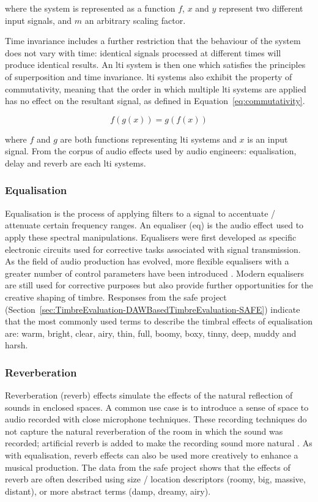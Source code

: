 		where the system is represented as a function $f$, $x$ and $y$ represent two different input signals, and
		$m$ an arbitrary scaling factor.

		Time invariance includes a further restriction that the behaviour of the system does not vary with time:
		identical signals processed at different times will produce identical results. An \acrshort{lti} system is
		then one which satisfies the principles of superposition and time invariance. \acrshort{lti} systems also
		exhibit the property of commutativity, meaning that the order in which multiple \acrshort{lti} systems are
		applied has no effect on the resultant signal, as defined in Equation~\ref{eq:commutativity}.

		\begin{equation} f(g(x)) = g(f(x)) \label{eq:commutativity} \end{equation}

		where $f$ and $g$ are both functions representing \acrshort{lti} systems and $x$ is an input signal.  From
		the corpus of audio effects used by audio engineers: equalisation, delay and reverb are each \acrshort{lti}
		systems.

		\subsubsection*{Equalisation}
			Equalisation is the process of applying filters to a signal to accentuate / attenuate certain
			frequency ranges. An equaliser (\acrshort{eq}) is the audio effect used to apply these spectral
			manipulations.  Equalisers were first developed as specific electronic circuits used for corrective
			tasks associated with signal transmission. As the field of audio production has evolved, more
			flexible equalisers with a greater number of control parameters have been introduced
			\citep{gottlieb2007shaping}. Modern equalisers are still used for corrective purposes but also
			provide further opportunities for the creative shaping of timbre. Responses from the
			\acrshort{safe} project (Section~\ref{sec:TimbreEvaluation-DAWBasedTimbreEvaluation-SAFE}) indicate
			that the most commonly used terms to describe the timbral effects of equalisation are: warm,
			bright, clear, airy, thin, full, boomy, boxy, tinny, deep, muddy and harsh.

		\subsubsection*{Reverberation}
			Reverberation (reverb) effects simulate the effects of the natural reflection of sounds in enclosed
			spaces. A common use case is to introduce a sense of space to audio recorded with close microphone
			techniques. These recording techniques do not capture the natural reverberation of the room in
			which the sound was recorded; artificial reverb is added to make the recording sound more natural
			\citep{gottlieb2007shaping}. As with equalisation, reverb effects can also be used more creatively
			to enhance a musical production. The data from the \acrshort{safe} project shows that the effects
			of reverb are often described using size / location descriptors (roomy, big, massive, distant), or
			more abstract terms (damp, dreamy, airy).

